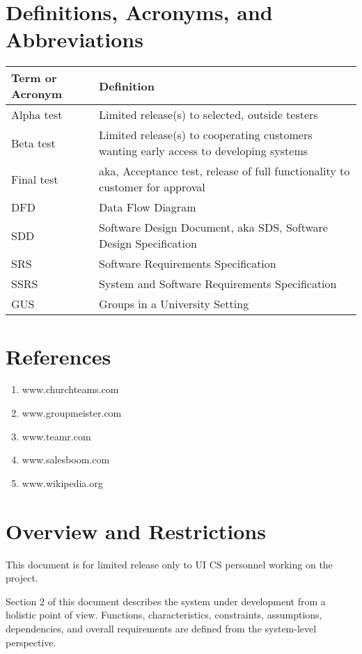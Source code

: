 \documentclass[12pt, oneside, letterpaper]{report}
\begin{document}
	\section{Definitions, Acronyms, and Abbreviations}
		\begin{tabular}{|p{4cm}|p{10cm}|}
		\hline
		\textbf{Term or Acronym} & \textbf{Definition} \\ \hline
		Alpha test & Limited release(s) to selected, outside testers \\ \hline
		Beta test & Limited release(s) to cooperating customers wanting early access to developing systems \\ \hline
		Final test & aka, Acceptance test, release of full functionality to customer for approval \\ \hline
		DFD & Data Flow Diagram \\ \hline
		SDD & Software Design Document, aka SDS, Software Design Specification \\ \hline
		SRS &  Software Requirements Specification \\ \hline
		SSRS & System and Software Requirements Specification \\ \hline
		GUS & Groups in a University Setting \\ \hline
		\end{tabular}
	\section{References}
		\begin{enumerate}
			\item www.churchteams.com
			\item www.groupmeister.com
			\item www.teamr.com
			\item www.salesboom.com
			\item www.wikipedia.org
		\end{enumerate}
	\section{Overview and Restrictions}

	This document is for limited release only to UI CS personnel
	working on the project.

		Section 2 of this document describes the system under development
		from a holistic point of view.  Functions, characteristics,
		constraints, assumptions, dependencies, and overall requirements
		are defined from the system-level perspective.
\end{document}
